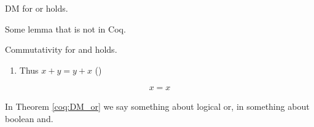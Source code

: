 \documentclass[a4paper,UKenglish,cleveref]{lipics-v2019}
\begin{document}
\begin{theorem}[][DM_or]
  DM for or holds.
\end{theorem}

\begin{lemma}[Name]
  Some lemma that is not in Coq.
\end{lemma}

\begin{lemma}
  Commutativity for and holds.
\end{lemma}

\begin{lemma}
  \begin{enumerate}
  \coqitem[plus_O] $x + 0 = x$
  \coqitem[plus_S] $x + S y = S (x + y)$
  \item Thus $x + y = y + x$ ()
\end{enumerate}
\end{lemma}

\begin{align*}
  x = x
\end{align*}

In Theorem \ref{coq:DM_or} we say something about logical or, in
 something about boolean and.
\end{document}
